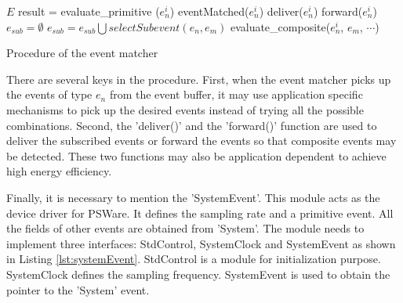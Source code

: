 \begin{algorithm}
\begin{algorithmic}
\REQUIRE \(E\)
				\STATE result = evaluate\_primitive (\(e_n^i\))
					\STATE eventMatched(\(e_n^i\))
						\STATE deliver(\(e_n^i\))
					\ELSE
						\STATE forward(\(e_n^i\))
					\ENDIF
				\ENDIF
			\ELSE
				\STATE \(e_{sub} = \emptyset \)
					\STATE \(e_{sub} = e_{sub}\bigcup selectSubevent (e_n, e_m)\)
				\ENDFOR
					\STATE evaluate\_composite(\(e_n^i\), \(e_m\), \(\cdots \))
				\ENDFOR
			\ENDIF
		\ENDFOR
	\ENDFOR
\end{algorithmic}
\caption{Procedure of the event matcher}
\label{algo:eventmatcher}
\end{algorithm}

There are several keys in the procedure. First, when the event matcher picks up the events of type \(e_n\) from the event buffer, it may use application specific mechanisms to pick up the desired events instead of trying all the possible combinations. Second, the 'deliver()' and the 'forward()' function are used to deliver the subscribed events or forward the events so that composite events may be detected. These two functions may also be application dependent to achieve high energy efficiency.

\begin{comment}
Figure \ref{fig:psware-interaction-simple} illustrates how different components in the middleware system interact with each other.

\begin{figure}
\centering
\figurecurrentwidth{psware-interaction-simple}
\caption{PSWare-E components interaction}
\label{fig:psware-interaction-simple}
\end{figure}
\subsection{PSWare Customization}
\end{comment}

Finally, it is necessary to mention the 'SystemEvent'. This module acts as the device driver for PSWare. It defines the sampling rate and a primitive event. All the fields of other events are obtained from 'System'. The module needs to implement three interfaces: StdControl, SystemClock and SystemEvent as shown in Listing \ref{lst:systemEvent}. StdControl is a module for initialization purpose. SystemClock defines the sampling frequency. SystemEvent is used to obtain the pointer to the 'System' event.

